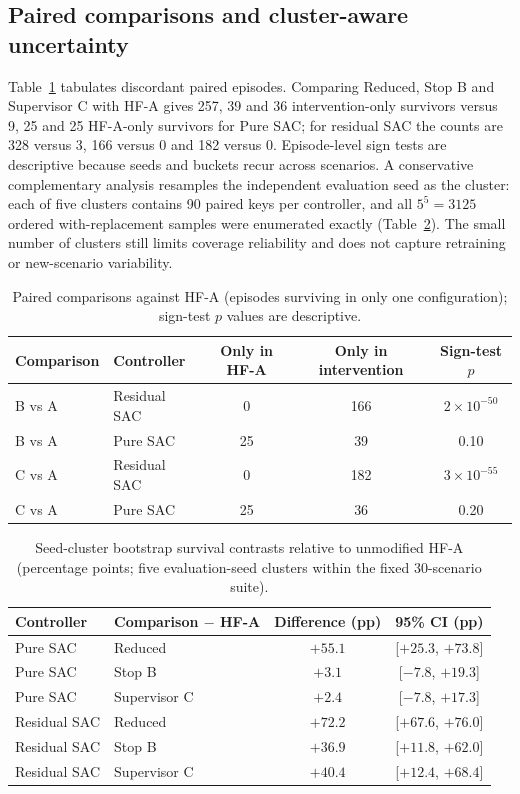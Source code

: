 \documentclass[preprint,12pt,authoryear=false]{elsarticle}
\theoremstyle{remark}\newtheorem{remark}{Remark}
\theoremstyle{plain}\newtheorem{proposition}{Proposition}\newtheorem{lemma}{Lemma}
\theoremstyle{definition}\newtheorem{assumption}{Assumption}
\begin{document}
\subsection{Paired comparisons and cluster-aware uncertainty}
Table~\ref{tab:disc} tabulates discordant paired episodes. Comparing Reduced, Stop B and Supervisor C with HF-A gives 257, 39 and 36 intervention-only survivors versus 9, 25 and 25 HF-A-only survivors for Pure SAC; for residual SAC the counts are 328 versus 3, 166 versus 0 and 182 versus 0. Episode-level sign tests are descriptive because seeds and buckets recur across scenarios. A conservative complementary analysis resamples the independent evaluation seed as the cluster: each of five clusters contains 90 paired keys per controller, and all $5^5=3125$ ordered with-replacement samples were enumerated exactly (Table~\ref{tab:boot}). The small number of clusters still limits coverage reliability and does not capture retraining or new-scenario variability.

\begin{table}[t]\centering\small
\caption{Paired comparisons against HF-A (episodes surviving in only one configuration); sign-test $p$ values are descriptive.}\label{tab:disc}
\begin{tabular}{llccc}\toprule
Comparison & Controller & Only in HF-A & Only in intervention & Sign-test $p$\\\midrule
B vs A & Residual SAC & 0 & 166 & $2\times10^{-50}$\\
B vs A & Pure SAC & 25 & 39 & 0.10\\
C vs A & Residual SAC & 0 & 182 & $3\times10^{-55}$\\
C vs A & Pure SAC & 25 & 36 & 0.20\\\bottomrule
\end{tabular}
\end{table}
\begin{table}[t]\centering\small
\caption{Seed-cluster bootstrap survival contrasts relative to unmodified HF-A (percentage points; five evaluation-seed clusters within the fixed 30-scenario suite).}\label{tab:boot}
\begin{tabular}{llcc}\toprule
Controller & Comparison $-$ HF-A & Difference (pp) & 95\% CI (pp)\\\midrule
Pure SAC & Reduced & $+55.1$ & [$+25.3$, $+73.8$]\\
Pure SAC & Stop B & $+3.1$ & [$-7.8$, $+19.3$]\\
Pure SAC & Supervisor C & $+2.4$ & [$-7.8$, $+17.3$]\\
Residual SAC & Reduced & $+72.2$ & [$+67.6$, $+76.0$]\\
Residual SAC & Stop B & $+36.9$ & [$+11.8$, $+62.0$]\\
Residual SAC & Supervisor C & $+40.4$ & [$+12.4$, $+68.4$]\\\bottomrule
\end{tabular}
\end{table}
\end{document}
